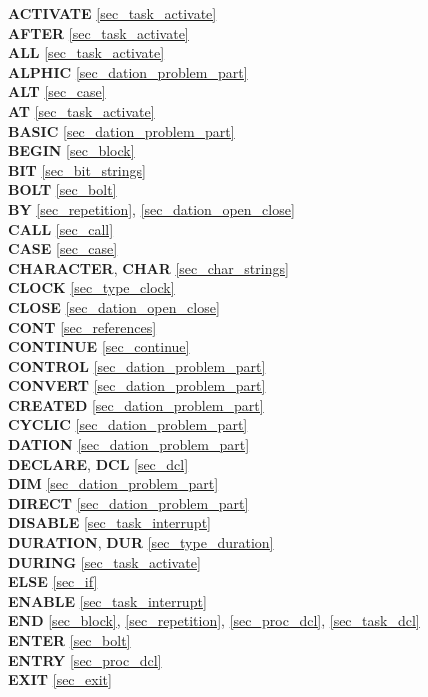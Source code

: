 {
{\bf ACTIVATE} \ref{sec_task_activate}\\
{\bf AFTER} \ref{sec_task_activate}\\
{\bf ALL} \ref{sec_task_activate}\\
{\bf ALPHIC} \ref{sec_dation_problem_part}\\
{\bf ALT} \ref{sec_case}\\
{\bf AT} \ref{sec_task_activate}\\

{\bf BASIC} \ref{sec_dation_problem_part}\\
{\bf BEGIN} \ref{sec_block} \\
{\bf BIT} \ref{sec_bit_strings}\\
{\bf BOLT} \ref{sec_bolt}\\
{\bf BY} \ref{sec_repetition}, \ref{sec_dation_open_close}\\

{\bf CALL} \ref{sec_call}\\
{\bf CASE} \ref{sec_case}\\
{\bf CHARACTER}, {\bf CHAR} \ref{sec_char_strings}\\
{\bf CLOCK} \ref{sec_type_clock}\\
{\bf CLOSE} \ref{sec_dation_open_close}\\
{\bf CONT} \ref{sec_references}\\
{\bf CONTINUE} \ref{sec_continue}\\
{\bf CONTROL} \ref{sec_dation_problem_part}\\
{\bf CONVERT} \ref{sec_dation_problem_part}\\
{\bf CREATED} \ref{sec_dation_problem_part}\\
{\bf CYCLIC} \ref{sec_dation_problem_part}\\
 
{\bf DATION} \ref{sec_dation_problem_part}\\
{\bf DECLARE}, {\bf DCL} \ref{sec_dcl}\\
{\bf DIM} \ref{sec_dation_problem_part}\\
{\bf DIRECT} \ref{sec_dation_problem_part}\\
{\bf DISABLE} \ref{sec_task_interrupt}\\
{\bf DURATION}, {\bf DUR} \ref{sec_type_duration}\\
{\bf DURING} \ref{sec_task_activate}\\

{\bf ELSE} \ref{sec_if}\\
{\bf ENABLE} \ref{sec_task_interrupt}\\
{\bf END} \ref{sec_block}, \ref{sec_repetition}, \ref{sec_proc_dcl},
	 \ref{sec_task_dcl}\\
{\bf ENTER} \ref{sec_bolt}\\
{\bf ENTRY} \ref{sec_proc_dcl}\\
{\bf EXIT} \ref{sec_exit}\\

}

